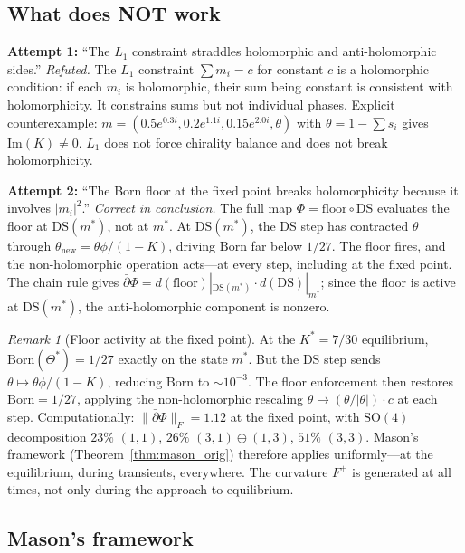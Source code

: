 \documentclass[11pt,a4paper]{article}
\theoremstyle{definition}
\theoremstyle{remark}
\newtheorem{remark}[theorem]{Remark}
\newcommand{\dbar}{\bar{\partial}}
\begin{document}
\subsection{What does NOT work}

\textbf{Attempt 1:} ``The $L_1$ constraint straddles holomorphic and anti-holomorphic sides.'' \emph{Refuted.} The $L_1$ constraint $\sum m_i=c$ for constant $c$ is a holomorphic condition: if each $m_i$ is holomorphic, their sum being constant is consistent with holomorphicity. It constrains sums but not individual phases. Explicit counterexample: $m=(0.5e^{0.3i},0.2e^{1.1i},0.15e^{2.0i},\theta)$ with $\theta=1-\sum s_i$ gives $\mathrm{Im}(K)\neq 0$. $L_1$ does not force chirality balance and does not break holomorphicity.

\textbf{Attempt 2:} ``The Born floor at the fixed point breaks holomorphicity because it involves $|m_i|^2$.'' \emph{Correct in conclusion.} The full map $\Phi=\mathrm{floor}\circ\mathrm{DS}$ evaluates the floor at $\mathrm{DS}(m^*)$, not at $m^*$. At $\mathrm{DS}(m^*)$, the DS step has contracted $\theta$ through $\theta_{\mathrm{new}}=\theta\phi/(1-K)$, driving $\mathrm{Born}$ far below $1/27$. The floor fires, and the non-holomorphic operation acts---at every step, including at the fixed point. The chain rule gives $\dbar\Phi=d(\mathrm{floor})|_{\mathrm{DS}(m^*)}\cdot d(\mathrm{DS})|_{m^*}$; since the floor is active at $\mathrm{DS}(m^*)$, the anti-holomorphic component is nonzero.

\begin{remark}[Floor activity at the fixed point]\label{rem:floor_active}
At the $K^*=7/30$ equilibrium, $\mathrm{Born}(\Theta^*)=1/27$ exactly on the state $m^*$. But the DS step sends $\theta\mapsto\theta\phi/(1-K)$, reducing $\mathrm{Born}$ to $\sim 10^{-3}$. The floor enforcement then restores $\mathrm{Born}=1/27$, applying the non-holomorphic rescaling $\theta\mapsto(\theta/|\theta|)\cdot c$ at each step. Computationally: $\|\dbar\Phi\|_F=1.12$ at the fixed point, with $\mathrm{SO}(4)$ decomposition $23\%$ $(1,1)$, $26\%$ $(3,1)\oplus(1,3)$, $51\%$ $(3,3)$. Mason's framework (Theorem~\ref{thm:mason_orig}) therefore applies uniformly---at the equilibrium, during transients, everywhere. The curvature $F^+$ is generated at all times, not only during the approach to equilibrium.
\end{remark}

\subsection{Mason's framework}\label{sec:mason_framework}
\end{document}
